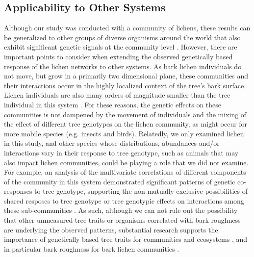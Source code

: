 \documentclass[11pt,twocolumn,twoside,lineno]{pnas-new}
\begin{document}
\subsection*{Applicability to Other Systems}

Although our study was conducted with a community of lichens, these
results can be generalized to other groups of diverse organisms around
the world that also exhibit significant genetic signals at the
community level \cite{Rowntree2011, Whitham2012}. However, there are
important points to consider when extending the observed genetically
based response of the lichen networks to other systems. As bark lichen
individuals do not move, but grow in a primarily two dimensional
plane, these communities and their interactions occur in the highly
localized context of the tree's bark surface. Lichen individuals are
also many orders of magnitude smaller than the tree individual in this
system \cite{Lamit2011}. For these reasons, the genetic effects on
these communities is not dampened by the movement of individuals and
the mixing of the effect of different tree genotypes on the lichen
community, as might occur for more mobile species (e.g. insects and
birds). Relatedly, we only examined lichen in this study, and other
species whose distributions, abundances and/or interactions vary in
their response to tree genotype, such as animals that may also impact
lichen communities, could be playing a role that we did not
examine. For example, an analysis of the multivariate correlations of
different components of the community in this system demonstrated
significant patterns of genetic co-responses to tree genotype,
supporting the non-mutually exclusive possibilities of shared resposes
to tree genotype or tree genotypic effects on interactions among these
sub-communities \cite{Lamit2015c}. As such, although we can not rule
out the possibility that other unmeasured tree traits or organisms
correlated with bark roughness are underlying the observed patterns,
substantial research supports the importance of genetically based tree
traits for communities and ecosystems
\cite{DesRoches2018TheVariation}, and in particular bark roughness for
bark lichen communities \cite{Bdeir2017, Lamit2011, Lamit2015a}.
\end{document}
